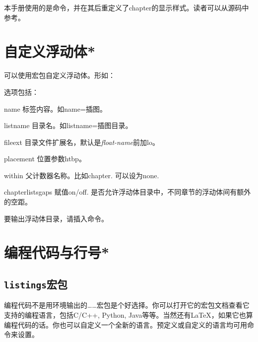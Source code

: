 本手册使用的是命令，并在其后重定义了chapter的显示样式。读者可以从源码中参考。

\section{自定义浮动体*}
可以使用宏包自定义浮动体。形如：
\begin{latex}
\end{latex}

选项包括：
\begin{para}
\item[name] 标签内容。如name=插图。
\item[listname] 目录名。如listname=插图目录。
\item[fileext] 目录文件扩展名，默认是\textit{float-name}前加lo。
\item[placement] 位置参数htbp。
\item[within] 父计数器名称。比如chapter. 可以设为none.
\item[chapterlistsgaps] 赋值on/off. 是否允许浮动体目录中，不同章节的浮动体间有额外的空距。
\end{para}

要输出浮动体目录，请插入命令。

\section{编程代码与行号*}
\label{sec:coding}
\subsection{\texttt{listings}宏包}
编程代码不是用环境输出的……宏包是个好选择。你可以打开它的宏包文档查看它支持的编程语言，包括C/C++, Python, Java等等。当然还有\LaTeX，如果它也算编程代码的话。你也可以自定义一个全新的语言。预定义或自定义的语言均可用命令来设置。
\begin{latex}
\end{latex}

